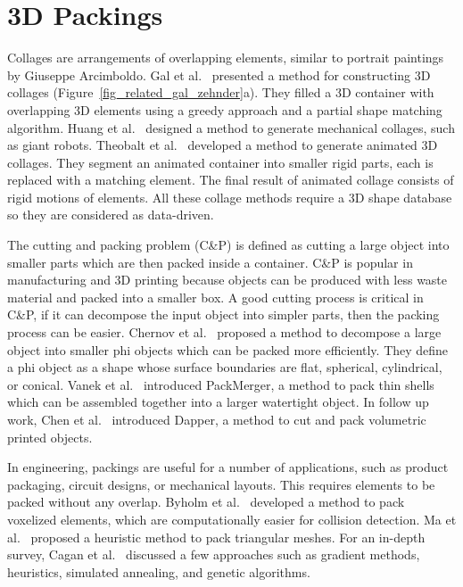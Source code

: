 \section{3D Packings}
\newtext
{
Collages are arrangements of overlapping elements, similar to
portrait paintings by Giuseppe Arcimboldo.
Gal et al.~\cite{Gal2007B} presented a method for constructing 3D
collages (Figure~\ref{fig_related_gal_zehnder}a).  
They filled a 3D container with overlapping 3D elements using a greedy
approach and a partial shape matching algorithm.
Huang et al.~\cite{Huang2014} designed a method
to generate mechanical collages, such as giant robots.
Theobalt et al.~\cite{Theobalt2007}
developed a method to generate animated 3D collages.
They segment an animated container
into smaller rigid parts, each is replaced with a matching element.
The final result of animated collage consists of rigid motions of elements.
All these collage methods require a 3D shape database so they are considered as data-driven. 
}

\newtext
{
The cutting and packing problem (C\&P) is defined as cutting a large object into smaller parts 
which are then packed inside a container.
C\&P is popular in manufacturing and 3D printing because
objects can be produced with less waste material and packed into a smaller box.
A good cutting process is critical in C\&P, if it can decompose the input object
into simpler parts, then the packing process can be easier.
Chernov et al.~\cite{Chernov2010} proposed a method to decompose a large object
into smaller phi objects which can be packed more efficiently.
They define a phi object as a shape whose surface boundaries 
are flat, spherical, cylindrical, or conical.
Vanek et al.~\cite{Vanek2014} introduced PackMerger,
a method to pack thin shells which can be assembled together into
a larger watertight object.
In follow up work, Chen et al.~\cite{Chen2015} introduced Dapper,
a method to cut and pack volumetric printed objects.
}

\newtext
{
In engineering, packings are useful for a number of applications, 
such as product packaging, circuit designs, or mechanical layouts.
This requires elements to be packed without any overlap.
Byholm et al.~\cite{Byholm2009} developed a method
to pack voxelized elements, which are computationally easier for collision detection.
Ma et al.~\cite{Ma2018} proposed a heuristic method to pack triangular meshes.
For an in-depth survey, Cagan et al.~\cite{Cagan2002} discussed a few approaches such as
gradient methods, heuristics, simulated annealing, and genetic algorithms.
}



